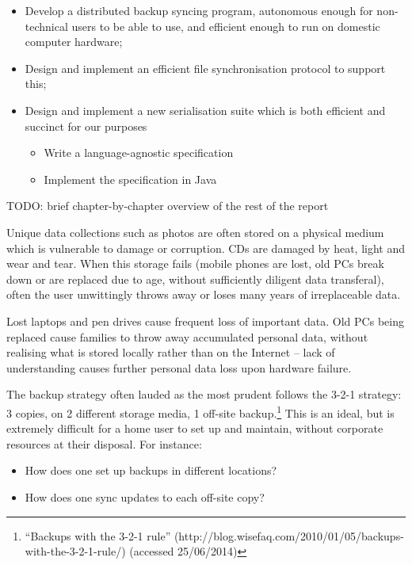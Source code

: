 \documentclass[12pt,a4paper,]{adreport}
\begin{document}
\begin{itemize}
\itemsep1pt\parskip0pt
\item
  Develop a distributed backup syncing program, autonomous enough for
  non-technical users to be able to use, and efficient enough to run on
  domestic computer hardware;
\item
  Design and implement an efficient file synchronisation protocol to
  support this;
\item
  Design and implement a new serialisation suite which is both efficient
  and succinct for our purposes

  \begin{itemize}
  \itemsep1pt\parskip0pt
  \item
    Write a language-agnostic specification
  \item
    Implement the specification in Java
  \end{itemize}
\end{itemize}

TODO: brief chapter-by-chapter overview of the rest of the report

Unique data collections such as photos are often stored on a physical
medium which is vulnerable to damage or corruption. CDs are damaged by
heat, light and wear and tear. When this storage fails (mobile phones
are lost, old PCs break down or are replaced due to age, without
sufficiently diligent data transferal), often the user unwittingly
throws away or loses many years of irreplaceable data.

Lost laptops and pen drives cause frequent loss of important data. Old
PCs being replaced cause families to throw away accumulated personal
data, without realising what is stored locally rather than on the
Internet -- lack of understanding causes further personal data loss upon
hardware failure.

The backup strategy often lauded as the most prudent follows the 3-2-1
strategy: 3 copies, on 2 different storage media, 1 off-site
backup.\footnote{``Backups with the 3-2-1 rule''
  (http://blog.wisefaq.com/2010/01/05/backups-with-the-3-2-1-rule/)
  (accessed 25/06/2014)} This is an ideal, but is extremely difficult
for a home user to set up and maintain, without corporate resources at
their disposal. For instance:

\begin{itemize}
\itemsep1pt\parskip0pt
\item
  How does one set up backups in different locations?
\item
  How does one sync updates to each off-site copy?
\end{itemize}
\end{document}
